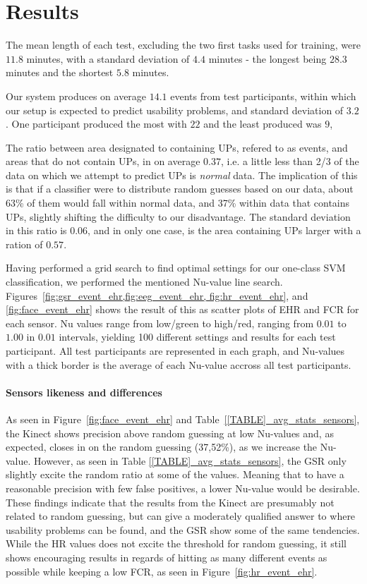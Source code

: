 \section{Results}
The mean length of each test, excluding the two first tasks used for training, were $11.8$ minutes, with a standard
deviation of $4.4$ minutes - the longest being $28.3$ minutes and the shortest $5.8$ minutes.

Our system produces on average $14.1$ events from test participants, within which our setup is expected to predict
usability problems, and standard deviation of $3.2$. One participant produced the most with $22$ and the least produced
was $9$,

The ratio between area designated to containing UPs, refered to as events, and areas that do not contain UPs, in on
average $0.37$, i.e. a little less than 2/3 of the data on which we attempt to predict UPs is \textit{normal} data. The
implication of this is that if a classifier were to distribute random guesses based on our data, about 63\% of them
would fall within normal data, and 37\% within data that contains UPs, slightly shifting the difficulty to our
disadvantage. The standard deviation in this ratio is $0.06$, and in only one case, is the area containing UPs larger
with a ration of $0.57$.



Having performed a grid search to find optimal settings for our one-class SVM classification, we performed the mentioned
Nu-value line search. Figures~\ref{fig:gsr_event_ehr,fig:eeg_event_ehr, fig:hr_event_ehr}, and \ref{fig:face_event_ehr}
shows the result of this as scatter plots of EHR and FCR for each sensor. Nu values range from low/green to high/red,
ranging from $0.01$ to $1.00$ in $0.01$ intervals, yielding 100 different settings and results for each test
participant. All test participants are represented in each graph, and Nu-values with a thick border is the average of
each Nu-value accross all test participants.

\paragraph{Sensors likeness and differences}

As seen in Figure~\ref{fig:face_event_ehr} and Table~\ref{[TABLE]_avg_stats_sensors}, the Kinect shows precision above random guessing at low Nu-values and,
as expected, closes in on the random guessing (37,52\%), as we increase the Nu-value. However, as seen in Table
\ref{[TABLE]_avg_stats_sensors}, the GSR only slightly excite the random ratio at some of the values. Meaning that
to have a reasonable precision with few false positives, a lower Nu-value would be desirable.
These findings indicate that the results from the Kinect are presumably not related to random guessing, but can give a moderately qualified answer to where usability problems can be found, and the GSR show some of the same tendencies.
While the HR values does not excite the threshold for random guessing, it still shows encouraging results in regards of hitting as many different events as possible while keeping a low FCR, as seen in Figure~\ref{fig:hr_event_ehr}.

